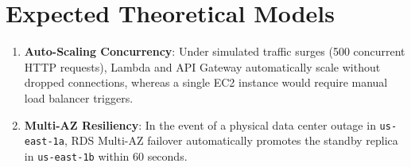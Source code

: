 \section{Expected Theoretical Models}
\begin{enumerate}
    \item \textbf{Auto-Scaling Concurrency}: Under simulated traffic surges (500 concurrent HTTP requests), Lambda and API Gateway automatically scale without dropped connections, whereas a single EC2 instance would require manual load balancer triggers.
    \item \textbf{Multi-AZ Resiliency}: In the event of a physical data center outage in \texttt{us-east-1a}, RDS Multi-AZ failover automatically promotes the standby replica in \texttt{us-east-1b} within 60 seconds.
\end{enumerate}
